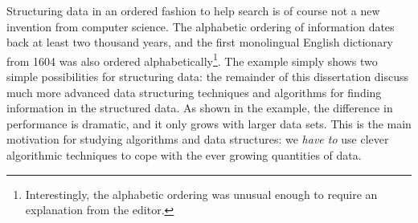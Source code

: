 \begin{leftbar}
\begin{comment}
    The worst case performance occur when $N$ does not contain $y$. Here, the first solution compares $y$ with all numbers in $N$, so the number of comparisons performed equals how many numbers are in $N$, which we write $|N|$. The alternative solution repeatedly use a single comparison to halve the size of the non-ignored part of the list until it reaches a size of $1$. Since $\log |N|$ is the number of halvings of $|N|$ until it reaches a size of at most $1$, we perform $\log |N|$ comparisons in the second solution.
        
    In the above descriptions we ignored the time spent constructing the data structures. This can be done in $\Oh(|X|)$ time for the unsorted list and $\Oh(|X| \log |X|)$ time for the sorted solution. As the list is only created once and then queried repeatedly, the sorted solution spend less time in total if we make more than a constant number of queries.    
    \end{comment}
\end{leftbar}

Structuring data in an ordered fashion to help search is of course not a new invention from computer science. The alphabetic ordering of information dates back at least two thousand years, and the first monolingual English dictionary from 1604 was also ordered alphabetically\footnote{Interestingly, the alphabetic ordering was unusual enough to require an explanation from the editor.}. The example simply shows two simple possibilities for structuring data: the remainder of this dissertation discuss much more advanced data structuring techniques and algorithms for finding information in the structured data. As shown in the example, the difference in performance is dramatic, and it only grows with larger data sets. This is the main motivation for studying algorithms and data structures: we \emph{have to} use clever algorithmic techniques to cope with the ever growing quantities of data.


